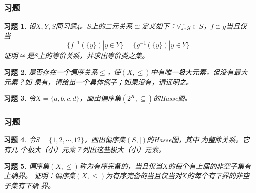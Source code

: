 \documentclass{beamer}
\newtheorem*{Exercise}{习题}
\begin{document}
\begin{CJK*}{UTF8}{gbsn}
\begin{frame}
  \frametitle{习题}
 \begin{Exercise}
  设$X, Y, S$同习题4。$S$上的二元关系$\cong$定义如下：$\forall f,g\in S$，$f \cong g$当且仅当\[\{f^{-1}(\{y\}) | y \in Y\} = \{g^{-1}(\{y\})|y \in Y\}\]证明$\cong$是$S$上的等价关系，并求出等价类之集。  
  \end{Exercise}
  \begin{Exercise}
    是否存在一个偏序关系$\leq$，使$(X,\leq)$中有唯一极大元素，但没有最大元素？如
    果有，请给出一个具体例子；如果没有，请证明之。
  \end{Exercise}
  \begin{Exercise}
    令$X=\{a,b,c,d\}$，画出偏序集$(2^X,\subseteq)$的Hasse图。
  \end{Exercise}
\end{frame}
\begin{frame}
  \frametitle{习题}
 \begin{Exercise}
 令$S=\{1,2,\cdots,12\}$，画出偏序集$(S,|)$的Hasse图，其中$|$为整除关系。它有几
 个极大（小）元素？列出这些极大（小）元素。
  \end{Exercise}
  \begin{Exercise}
    偏序集$(X,\leq)$称为有序完备的，当且仅当$X$的每个有上届的非空子集有上确界。
    证明：偏序集$(X,\leq)$为有序完备的当且仅当对$X$的每个有下界的非空子集有下确
    界。
  \end{Exercise}
\end{frame}

\end{CJK*}
\end{document}
